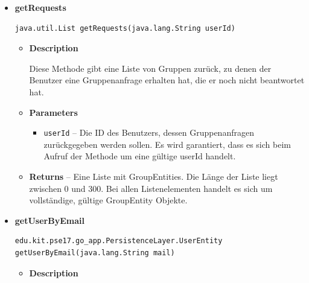 \documentclass[11pt,a4paper]{article}
\begin{document}
{{{{{{{{{{{\begin{itemize}
{\begin{itemize}
{Diese Methode gibt eine Liste mit allen Gruppen zurück, in denen der Benutzer Mitglied ist. Dies schließt Gruppen nicht mit ein, zu denen der Benutzer eingeladen wurde, er die Gruppenanfrage aber noch nicht beantwortet hat.
}
\item{
{\bf  Parameters}
  \begin{itemize}
   \item{
\texttt{userId} -- Die ID des Benutzers, dessen Gruppen zurückgegeben werden sollen. Es wird garantiert, dass es sich beim Aufruf der Methode um eine gültige userid handelt.}
  \end{itemize}
}%
\item{{\bf  Returns} -- 
Eine Liste mit GroupEntities. Die Länge der Liste liegt zwischen 0 und 300. Bei allen Listenelementen handelt es sich um vollständige, gültige GroupEntity Objekte. 
}%
\end{itemize}
}%
\item{ 
\hypertarget{edu.kit.pse17.go_app.PersistenceLayer.daos.UserDao.getRequests(java.lang.String)}{{\bf  getRequests}\\}
\begin{lstlisting}[frame=none]
java.util.List getRequests(java.lang.String userId)\end{lstlisting} %
\begin{itemize}
\item{
{\bf  Description}

Diese Methode gibt eine Liste von Gruppen zurück, zu denen der Benutzer eine Gruppenanfrage erhalten hat, die er noch nicht beantwortet hat.
}
\item{
{\bf  Parameters}
  \begin{itemize}
   \item{
\texttt{userId} -- Die ID des Benutzers, dessen Gruppenanfragen zurückgegeben werden sollen. Es wird garantiert, dass es sich beim Aufruf der Methode um eine gültige userId handelt.}
  \end{itemize}
}%
\item{{\bf  Returns} -- 
Eine Liste mit GroupEntities. Die Länge der Liste liegt zwischen 0 und 300. Bei allen Listenelementen handelt es sich um vollständige, gültige GroupEntity Objekte. 
}%
\end{itemize}
}%
\item{ 
\hypertarget{edu.kit.pse17.go_app.PersistenceLayer.daos.UserDao.getUserByEmail(java.lang.String)}{{\bf  getUserByEmail}\\}
\begin{lstlisting}[frame=none]
edu.kit.pse17.go_app.PersistenceLayer.UserEntity getUserByEmail(java.lang.String mail)\end{lstlisting} %
\begin{itemize}
\item{
{\bf  Description}

}
\end{itemize}}
\end{itemize}}}}}}}}}}}}
\end{document}
